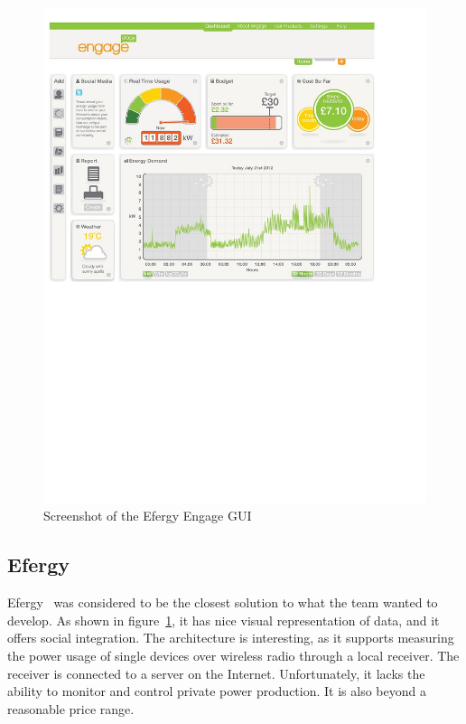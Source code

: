 \begin{figure}[H]
\centering
\includegraphics[width=13cm, trim=0.5cm 12cm 3cm 0.7cm, clip]{ch/prestudy/fig/efergy.pdf}
\caption{Screenshot of the Efergy Engage GUI}
\label{fig:efergyGUI}
\end{figure}


\subsection{Efergy}

Efergy~\cite{efergy} was considered to be the closest solution to what the team wanted to develop. As shown in figure~\ref{fig:efergyGUI}, it has nice visual representation of data, and it offers social integration. The architecture is interesting, as it supports measuring the power usage of single devices over wireless radio through a local receiver. The receiver is connected to a server on the Internet. Unfortunately, it lacks the ability to monitor and control private power production. It is also beyond a reasonable price range.



